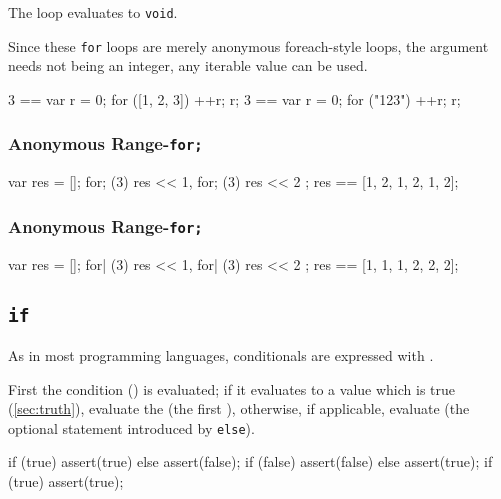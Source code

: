The loop evaluates to \lstinline{void}.

Since these \lstinline{for} loops are merely anonymous foreach-style loops,
the argument needs not being an integer, any iterable value can be used.

\begin{urbiassert}
3 == { var r = 0; for ([1, 2, 3]) ++r; r};
3 == { var r = 0; for ("123")     ++r; r};
\end{urbiassert}


\subsubsection{Anonymous Range-\lstinline{for;}}
\label{sec:lang:forn:semi}

\begin{urbiassert}
{
  var res = [];
  for; (3) res << 1, for; (3) res << 2 ;
  res
}
  == [1, 2, 1, 2, 1, 2];
\end{urbiassert}

\subsubsection{Anonymous Range-\lstinline{for;}}
\label{sec:lang:forn:pipe}

\begin{urbiassert}
{
  var res = [];
  for| (3) res << 1, for| (3) res << 2 ;
  res
}
  == [1, 1, 1, 2, 2, 2];
\end{urbiassert}

\subsection{\lstinline{if}}
\label{sec:lang:if}
As in most programming languages, conditionals are expressed with
.



First the condition () is evaluated; if it evaluates to a
value which is true (\autoref{sec:truth}), evaluate the 
(the first ), otherwise, if applicable, evaluate
 (the optional statement introduced by \lstinline{else}).

\begin{urbiscript}
if (true)  assert(true) else assert(false);
if (false) assert(false) else assert(true);
if (true)  assert(true);
\end{urbiscript}

